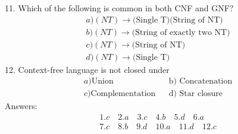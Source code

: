 \documentclass[12pt,a4paper]{book}
\begin{document}
11. Which of the following is common in both CNF and GNF?
\begin{align*}
&a) (NT) \to \text{(Single T)(String of NT)}\\
&b) (NT) \to \text{(String of exactly two NT)}\\
&c) (NT) \to \text{(String of NT)}\\
&d) (NT) \to \text{(Single T)}
\end{align*}
12. Context-free language is not closed under
\begin{align*}
&a) \text{Union} \quad &&\text{b) Concatenation}\\
&c) \text{Complementation} &&\text{d) Star closure}
\end{align*}
Answers:
\begin{align*}
&1. c \quad 2. a\quad 3. c\quad 4. b \quad5. d \quad6. a\\
&7. c \quad8. b \quad9. d \quad10. a \quad11. d \quad 12. c
\end{align*}
\end{document}
